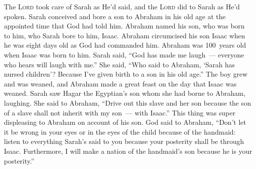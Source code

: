 
\begin{inparaenum}
     The \textsc{Lord} took care of Sarah as He'd said, and the \textsc{Lord} did to Sarah as He'd spoken.%
     Sarah conceived and bore a son to Abraham in his old age at the appointed time that God had told him.%
     Abraham named his son, who was born to him, who Sarah bore to him, Isaac.%
     Abraham circumcised his son Isaac when he was eight days old as God had commanded him.%
     Abraham was 100~years old when Isaac was born to him.%
     Sarah said, ``God has made me laugh~--- everyone who hears will laugh with me.''%
     She said, ``Who said to Abraham, `Sarah has nursed children'? Because I've given birth to a son in his old age.''%
     The boy grew and was weaned, and Abraham made a great feast on the day that Isaac was weaned.%
     Sarah saw Hagar the Egyptian's son whom she had borne to Abraham, laughing.%
     She said to Abraham, ``Drive out this slave and her son because the son of a slave shall not inherit with my son~--- with Isaac.''%
     This\understood{} thing was super displeasing to Abraham on account of his son.%
     God said to Abraham, ``Don't let it be wrong in your eyes or in the eyes of the child because of the handmaid: listen to everything Sarah's said to you because your posterity shall be through Isaac.%
     Furthermore, I will make a nation of the handmaid's son because he is your posterity.''%

\end{inparaenum}
